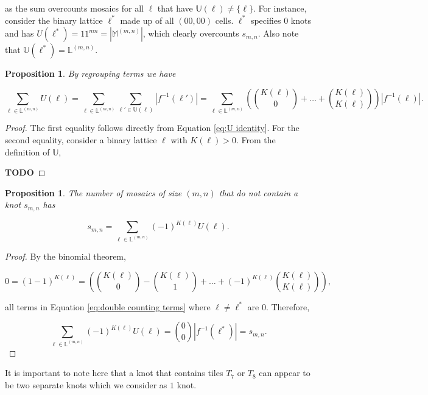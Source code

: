 \documentclass[12pt]{article}
\theoremstyle{plain}
\newtheorem{prop}[thm]{Proposition}
\theoremstyle{definition}
\theoremstyle{remark}
\theoremstyle{definition}
\begin{document}
as the sum overcounts mosaics for all $\ell$ that have $\mathbb{U}(\ell) \neq \{\ell\}$. For instance, consider the binary lattice $\ell^*$ made up of all $(00,00)$ cells. $\ell^*$ specifies $0$ knots and has $U(\ell^*) = 11^{mn} = \left|\mathbb{M}^{(m,n)}\right|$, which clearly overcounts $s_{m,n}$. Also note that $\mathbb{U}(\ell^*) = \mathbb{L}^{(m,n)}$.


\begin{prop}
    By regrouping terms we have

    \begin{equation}
        \sum_{\ell \in \mathbb{L}^{(m,n)}} U(\ell) = \sum_{\ell \in \mathbb{L}^{(m,n)}}\sum_{\ell' \in \mathbb{U}(\ell)}|f^{-1}(\ell')| = \sum_{\ell \in \mathbb{L}^{(m,n)}} \left(\binom{K(\ell)}{0} + \dots + \binom{K(\ell)}{K(\ell)}\right)|f^{-1}(\ell)|.
        \label{eq:double counting terms}
    \end{equation}
\end{prop}

\begin{proof}
    The first equality follows directly from Equation \ref{eq:U identity}. For the second equality, consider a binary lattice $\ell$ with $K(\ell)>0$. From the definition of $\mathbb{U}$, 

    \textbf{TODO}
\end{proof}

\begin{prop}
    The number of mosaics of size $(m,n)$ that do not contain a knot $s_{m,n}$ has

    \begin{equation}
    s_{m,n} = \sum_{\ell \in \mathbb{L}^{(m,n)}} (-1)^{K(\ell)} U(\ell).
    \label{eq:ugly inc excl}
    \end{equation}
\end{prop}

\begin{proof}
    By the binomial theorem,
    
    $$0 = (1-1)^{K(\ell)} = \left(\binom{K(\ell)}{0} - \binom{K(\ell)}{1} + \dots + (-1)^{K(\ell)}\binom{K(\ell)}{K(\ell)}\right),$$
    
    all terms in Equation \ref{eq:double counting terms} where $\ell \neq \ell^*$ are $0$. Therefore, 
    
    $$\sum_{\ell \in \mathbb{L}^{(m,n)}} (-1)^{K(\ell)} U(\ell) = \binom{0}{0}|f^{-1}(\ell^*)| = s_{m,n}.$$
\end{proof}

It is important to note here that a knot that contains tiles $T_7$ or $T_8$ can appear to be two separate knots which we consider as $1$ knot.
\end{document}
